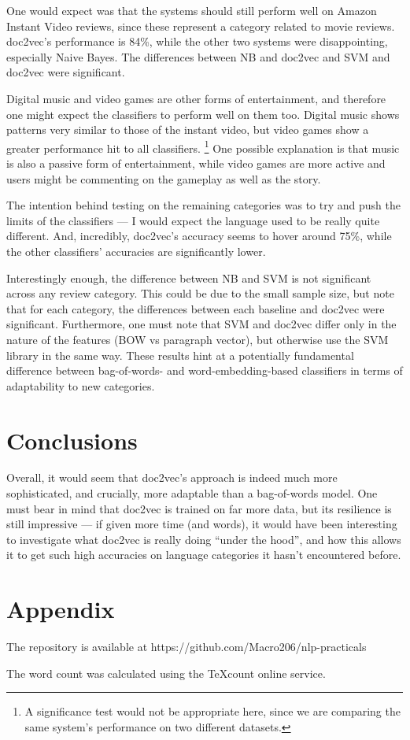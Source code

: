 \documentclass[12pt,a4paper,twoside,twocolumn]{article}
\begin{document}
One would expect was that the systems should still perform well on Amazon Instant Video reviews, since these represent a category related to movie reviews. doc2vec's performance is 84\%, while the other two systems were disappointing, especially Naive Bayes. The differences between NB and doc2vec and SVM and doc2vec were significant.

Digital music and video games are other forms of entertainment, and therefore one might expect the classifiers to perform well on them too. Digital music shows patterns very similar to those of the instant video, but video games show a greater performance hit to all classifiers. \footnote{A significance test would not be appropriate here, since we are comparing the same system's performance on two different datasets.} One possible explanation is that music is also a passive form of entertainment, while video games are more active and users might be commenting on the gameplay as well as the story.

The intention behind testing on the remaining categories was to try and push the limits of the classifiers --- I would expect the language used to be really quite different. And, incredibly, doc2vec's accuracy seems to hover around 75\%, while the other classifiers' accuracies are significantly lower.

Interestingly enough, the difference between NB and SVM is not significant across any review category. This could be due to the small sample size, but note that for each category, the differences between each baseline and doc2vec were significant. Furthermore, one must note that SVM and doc2vec differ only in the nature of the features (BOW vs paragraph vector), but otherwise use the SVM library in the same way. These results hint at a potentially fundamental difference between bag-of-words- and word-embedding-based classifiers in terms of adaptability to new categories.


\section{Conclusions}

Overall, it would seem that doc2vec's approach is indeed much more sophisticated, and crucially, more adaptable than a bag-of-words model. One must bear in mind that doc2vec is trained on far more data, but its resilience is still impressive --- if given more time (and words), it would have been interesting to investigate what doc2vec is really doing ``under the hood'', and how this allows it to get such high accuracies on language categories it hasn't encountered before.

\vspace{16px}

\section{Appendix}

The repository is available at https://github.com/Macro206/nlp-practicals

The word count was calculated using the TeXcount online service.
\end{document}
